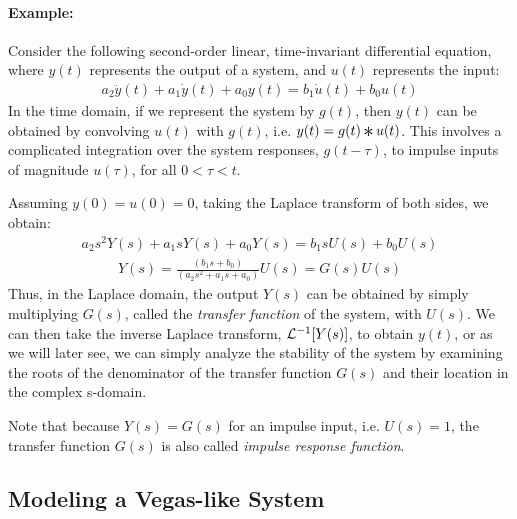 \documentclass{article}
\def\L{{\cal L}}
\newcommand{\Conv}{\mathop{\scalebox{1.5}{\raisebox{-0.2ex}{$\ast$}}}}%
\begin{document}
\paragraph{Example:}
Consider the following second-order linear, time-invariant differential equation, where $y(t)$ represents the output of a system, and $u(t)$ represents the input:
\begin{eqnarray*}
a_2 \ddot{y}(t) + a_1 \dot{y}(t) + a_0 y(t) = b_1 \dot{u}(t) + b_0 u(t)
\end{eqnarray*}
In the time domain, if we represent the system by $g(t)$,
then $y(t)$ can be obtained by convolving $u(t)$ with $g(t)$, i.e. $y(t)=g(t) \Conv u(t)$.
This involves a complicated integration over the system responses,
$g(t-\tau)$, to impulse inputs of magnitude $u(\tau)$, for all $0 < \tau < t$.

Assuming $y(0)=u(0)=0$, taking the Laplace transform of both sides, we obtain:
\begin{eqnarray*}
a_2 s^2 Y(s) + a_1 s Y(s) + a_0 Y(s) = b_1 s U(s) + b_0 U(s)
\end{eqnarray*}
\begin{eqnarray*}
Y(s) = \frac{(b_1 s  + b_0)}{(a_2 s^2 + a_1 s  + a_0)}  U(s) = G(s) U(s)
\end{eqnarray*}
Thus, in the Laplace domain, the output $Y(s)$ can be obtained by simply multiplying 
$G(s)$, called the {\em transfer function} of the system, with $U(s)$.
We can then take the inverse Laplace transform, $\L^{-1}[Y(s)]$, to obtain $y(t)$,
or as we will later see, we can simply analyze the stability of the system by examining 
the roots of the denominator of the transfer function $G(s)$ and their location in the complex s-domain.

Note that because $Y(s) =  G(s)$ for an impulse input, i.e. $U(s)=1$,
the transfer function $G(s)$ is also called {\em impulse response function}.

\subsection{Modeling a Vegas-like System}
\end{document}
